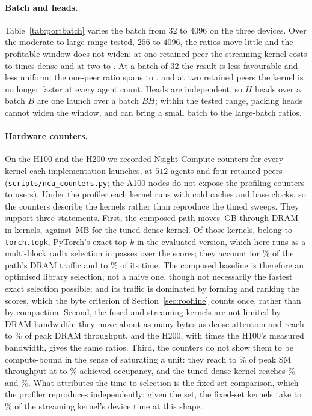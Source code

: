 \paragraph{Batch and heads.} Table~\ref{tab:portbatch} varies the batch from
$32$ to $4096$ on the three devices. Over the moderate-to-large range tested,
$256$ to $4096$, the ratios move little and the profitable window does not
widen: at one retained peer the streaming kernel costs \PortBatchOneLo{} to
\PortBatchOneHi{} times dense and at two \PortBatchTwoLo{} to
\PortBatchTwoHi{}. At a batch of $32$ the result is less favourable and less
uniform: the one-peer ratio spans \PortBatchSmallOneLo{} to
\PortBatchSmallOneHi{}, and at two retained peers the kernel is no longer faster
at every agent count. Heads are independent, so $H$ heads over a batch $B$ are one
launch over a batch $BH$; within the tested range, packing heads cannot widen
the window, and can bring a small batch to the large-batch ratios.

\paragraph{Hardware counters.} On the H100 and the H200 we recorded Nsight
Compute counters for every kernel each implementation launches, at $512$ agents
and four retained peers (\texttt{scripts/ncu\_counters.py}; the A100 nodes do not
expose the profiling counters to users). Under the profiler each kernel runs
with cold caches and base clocks, so the counters describe the kernels rather
than reproduce the timed sweeps. They support three statements. First, the
composed path moves \PortNcuComposedGB{}\,GB through DRAM in
\PortNcuKernels{} kernels, against \PortNcuDenseMB{}\,MB for the tuned dense
kernel. Of those kernels, \PortNcuSelectKernels{} belong to \texttt{torch.topk},
PyTorch's exact top-$k$ in the evaluated version, which here runs as a
multi-block radix selection in \PortNcuRadixPasses{} passes over the scores;
they account for \PortNcuSelectBytesLo{}\% of the path's DRAM traffic and
\PortNcuSelectShareLo{} to \PortNcuSelectShareHi{}\% of its time. The composed
baseline is therefore an optimised library selection, not a naive one, though
not necessarily the fastest exact selection possible; and its traffic is
dominated by forming and ranking the scores, which the byte criterion of
Section~\ref{sec:roofline} counts once, rather than by compaction. Second, the
fused and streaming kernels are not limited by DRAM bandwidth: they move about
as many bytes as dense attention and reach \PortNcuFusedDramLo{} to
\PortNcuFusedDramHi{}\% of peak DRAM throughput, and the H200, with
\PortBwRatioHTwoHundred{} times the H100's measured bandwidth, gives the same
ratios. Third, the counters do not show them to be compute-bound in the sense of
saturating a unit: they reach \PortNcuFusedSmLo{} to \PortNcuFusedSmHi{}\% of peak
SM throughput at \PortNcuFusedOccLo{} to \PortNcuFusedOccHi{}\% achieved
occupancy, and the tuned dense kernel reaches \PortNcuDenseSmHi{}\% and
\PortNcuDenseDramHi{}\%. What attributes the time to selection is the fixed-set
comparison, which the profiler reproduces independently: given the set, the
fixed-set kernels take \PortNcuFixedShareLo{} to \PortNcuFixedShareHi{}\% of the
streaming kernel's device time at this shape.

